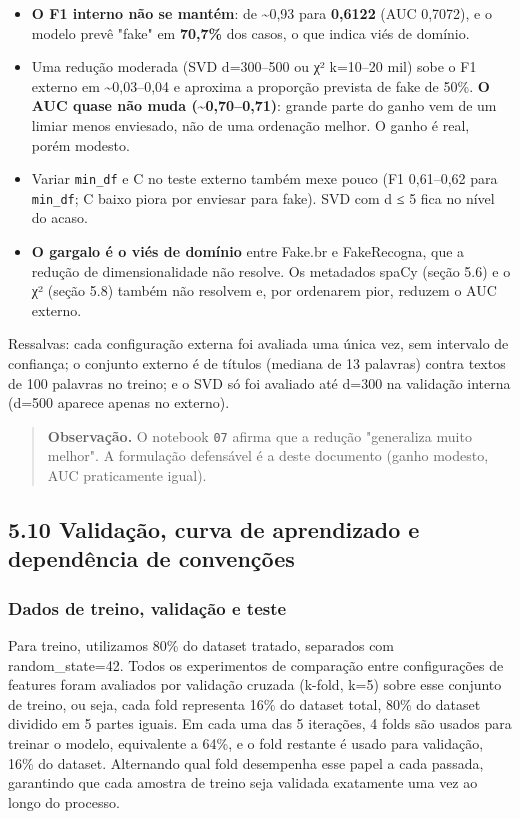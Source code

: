 \documentclass[
  brazilian,
  11pt,
]{article}
\providecommand{\tightlist}{%
  \setlength{\itemsep}{0pt}\setlength{\parskip}{0pt}}
\begin{document}
\begin{itemize}
\tightlist
\item
  \textbf{O F1 interno não se mantém}: de \textasciitilde0,93 para \textbf{0,6122} (AUC 0,7072), e o modelo prevê "fake" em \textbf{70,7\%} dos casos, o que indica viés de domínio.
\item
  Uma redução moderada (SVD d=300--500 ou χ² k=10--20 mil) sobe o F1 externo em \textasciitilde0,03--0,04 e aproxima a proporção prevista de fake de 50\%. \textbf{O AUC quase não muda (\textasciitilde0,70--0,71)}: grande parte do ganho vem de um limiar menos enviesado, não de uma ordenação melhor. O ganho é real, porém modesto.
\item
  Variar \texttt{min\_df} e C no teste externo também mexe pouco (F1 0,61--0,62 para \texttt{min\_df}; C baixo piora por enviesar para fake). SVD com d ≤ 5 fica no nível do acaso.
\item
  \textbf{O gargalo é o viés de domínio} entre Fake.br e FakeRecogna, que a redução de dimensionalidade não resolve. Os metadados spaCy (seção 5.6) e o χ² (seção 5.8) também não resolvem e, por ordenarem pior, reduzem o AUC externo.
\end{itemize}

Ressalvas: cada configuração externa foi avaliada uma única vez, sem intervalo de confiança; o conjunto externo é de títulos (mediana de 13 palavras) contra textos de 100 palavras no treino; e o SVD só foi avaliado até d=300 na validação interna (d=500 aparece apenas no externo).

\begin{quote}
\textbf{Observação.} O notebook \texttt{07} afirma que a redução "generaliza muito melhor". A formulação defensável é a deste documento (ganho modesto, AUC praticamente igual).
\end{quote}

\subsection{5.10 Validação, curva de aprendizado e dependência de convenções}\label{validauxe7uxe3o-curva-de-aprendizado-e-dependuxeancia-de-convenuxe7uxf5es}

\subsubsection{Dados de treino, validação e teste}\label{dados-de-treino-validauxe7uxe3o-e-teste}

Para treino, utilizamos 80\% do dataset tratado, separados com random\_state=42. Todos os experimentos de comparação entre configurações de features foram avaliados por validação cruzada (k-fold, k=5) sobre esse conjunto de treino, ou seja, cada fold representa 16\% do dataset total, 80\% do dataset dividido em 5 partes iguais. Em cada uma das 5 iterações, 4 folds são usados para treinar o modelo, equivalente a 64\%, e o fold restante é usado para validação, 16\% do dataset. Alternando qual fold desempenha esse papel a cada passada, garantindo que cada amostra de treino seja validada exatamente uma vez ao longo do processo.
\end{document}
